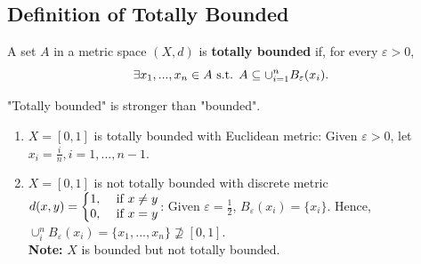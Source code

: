 \documentclass[11pt]{elegantbook}
\begin{document}
\subsection{Definition of Totally Bounded}
\begin{definition}
    \normalfont
    A set $A$ in a metric space $(X, d)$ is \textbf{totally bounded} if, for every $\varepsilon > 0$, $$\exists x_1,...,x_n\in A \textnormal{ s.t. }A\subseteq \cup_{i=1}^n B_{\varepsilon}(x_i).$$
\end{definition}
\begin{claim}
    "Totally bounded" is stronger than "bounded".
\end{claim}
\begin{example}
    \begin{enumerate}
        \item $X=[0,1]$ is totally bounded with Euclidean metric: Given $\varepsilon>0$, let $x_i=\frac{i}{n}, i=1,...,n-1$.
        \item $X=[0,1]$ is not totally bounded with discrete metric $d(x,y)=\left\{\begin{matrix}
            1,& \textnormal{ if }x\neq y\\
            0,& \textnormal{ if }x=y
        \end{matrix}\right.$: Given $\varepsilon=\frac{1}{2}$, $B_\varepsilon(x_i)=\{x_i\}$. Hence, $\cup_i^n B_{\varepsilon}(x_i)=\{x_1,...,x_n\}\nsupseteq[0,1]$.\\
        \textbf{Note:} $X$ is bounded but not totally bounded.
    \end{enumerate}
\end{example}
\end{document}
